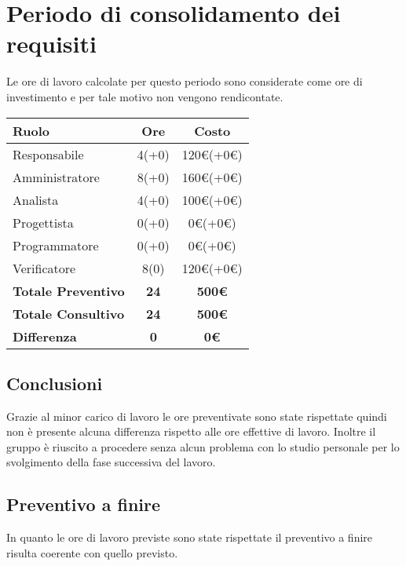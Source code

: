 {\section{Periodo di consolidamento dei requisiti}\label{ConsuntivoPeriodoDiConsolidamentoDeiRequisiti}
Le ore di lavoro calcolate per questo periodo sono considerate come ore di investimento e per tale motivo non vengono rendicontate.

\quad
\def\tabularxcolumn#1{m{#1}}
{
	\begin{center}
		\renewcommand{\arraystretch}{1.4}
		\begin{tabularx}{10cm}{|X|c|c|}
			\hline
			\rowcolor{airforceblue}
			\textbf{Ruolo} & \textbf{Ore} & \textbf{Costo}\\
			\hline
			Responsabile & 4(+0) & 120\euro(+0\euro)\\
			\hline
			Amministratore & 8(+0) & 160\euro(+0\euro)\\
			\hline
			Analista & 4(+0) & 100\euro(+0\euro)\\
			\hline
			Progettista & 0(+0) & 0\euro(+0\euro)\\
			\hline
			Programmatore & 0(+0) & 0\euro(+0\euro)\\
			\hline
			Verificatore & 8(0) & 120\euro(+0\euro)\\
			\hline
			\textbf{Totale Preventivo} & \textbf{24} & \textbf{500\euro}\\
			\hline
			\textbf{Totale Consultivo} & \textbf{24} & \textbf{500\euro}\\
			\hline
			\textbf{Differenza} & \textbf{0} & \textbf{0\euro}
		\end{tabularx}
	\end{center}

\subsection{Conclusioni}\label{ConsuntivoPeriodoDiConsolidamentoDeiRequisitiConclusioni}
Grazie al minor carico di lavoro le ore preventivate sono state rispettate quindi non è presente alcuna differenza rispetto alle ore effettive di lavoro. Inoltre il gruppo è riuscito a procedere senza alcun problema con lo studio personale per lo svolgimento della fase successiva del lavoro.

\subsection{Preventivo a finire}\label{ConsuntivoPeriodoDiConsolidamentoDeiRequisitiPreventivoAFinire}
In quanto le ore di lavoro previste sono state rispettate il preventivo a finire risulta coerente con quello previsto.

}}
